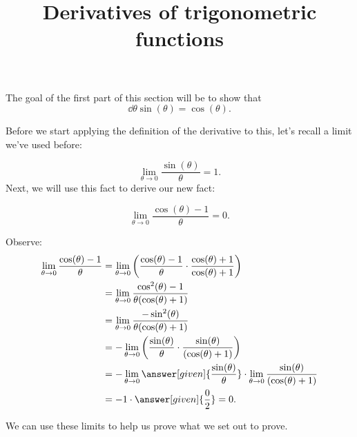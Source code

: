 \documentclass{ximera}
\title{Derivatives of trigonometric functions}
\begin{document}
\begin{abstract}
\end{abstract}
\maketitle


The goal of the first part of this section will be to show that
\[
\dd{\theta}\sin(\theta)=\cos(\theta).
\]

Before we start applying the definition of the derivative to this, let's recall a limit we've used before:

\[
\lim_{\theta\to 0} \frac{\sin(\theta)}{\theta} = 1. %
\]
Next, we will use this fact to derive our new fact:
\begin{example}
  \[
\lim_{\theta\to 0}\frac{\cos(\theta)-1}{\theta} = 0.
  \]
  \begin{explanation}
Observe:
\begin{align*}
\lim_{\theta\to 0}\frac{\cos(\theta)-1}{\theta} &= \lim_{\theta\to 0}\left(\frac{\cos(\theta)-1}{\theta}\cdot\frac{\cos(\theta)+1}{\cos(\theta)+1}\right)\\
&=\lim_{\theta\to 0}\frac{\cos^2(\theta)-1}{\theta(\cos(\theta)+1)}\\
&=\lim_{\theta\to 0}\frac{-\sin^2(\theta)}{\theta(\cos(\theta)+1)}\\
&=-\lim_{\theta\to 0}\left(\frac{\sin(\theta)}{\theta}\cdot\frac{\sin(\theta)}{(\cos(\theta)+1)}\right)\\
&=-\lim_{\theta\to 0}\answer[given]{\frac{\sin(\theta)}{\theta}} \cdot \lim_{\theta\to 0}\frac{\sin(\theta)}{(\cos(\theta)+1)}\\
&= -1 \cdot \answer[given]{\frac{0}{2}} = 0.
\end{align*}
  \end{explanation}
\end{example}

We can use these limits to help us prove what we set out to prove.
\end{document}
